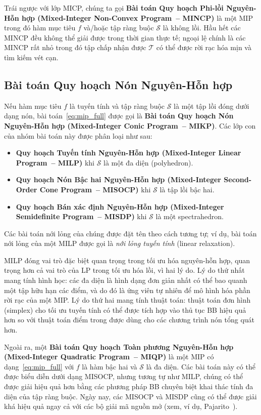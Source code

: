 Trái ngược với lớp MICP, chúng ta gọi \textbf{Bài toán Quy hoạch Phi-lồi Nguyên-Hỗn hợp
(Mixed-Integer Non-Convex Program~-- MINCP)} là một MIP trong đó hàm mục tiêu $f$ và/hoặc tập ràng buộc
$\mathcal{S}$ là không lồi.
Hầu hết các MINCP đều không thể giải được trong thời gian thực tế; ngoại lệ chính là các MINCP
rất nhỏ trong đó tập chấp nhận được $\mathcal{T}$ có thể được rời rạc hóa mịn và tìm kiếm vét cạn.

\subsection{Bài toán Quy hoạch Nón Nguyên-Hỗn hợp}

Nếu hàm mục tiêu $f$ là tuyến tính và tập ràng buộc $\mathcal{S}$ là một tập lồi đóng dưới dạng nón,
bài toán~\eqref{eq:mip_full} được gọi là \textbf{Bài toán Quy hoạch Nón Nguyên-Hỗn hợp
(Mixed-Integer Conic Program~-- MIKP)}.
Các lớp con của nhóm bài toán này được phân loại như sau:

\begin{itemize}
    \item \textbf{Quy hoạch Tuyến tính Nguyên-Hỗn hợp (Mixed-Integer Linear Program~-- MILP)}
    khi $\mathcal{S}$ là một đa diện (polyhedron).
    \item \textbf{Quy hoạch Nón Bậc hai Nguyên-Hỗn hợp (Mixed-Integer Second-Order Cone Program~-- MISOCP)}
    khi $\mathcal{S}$ là tập lồi bậc hai.
    \item \textbf{Quy hoạch Bán xác định Nguyên-Hỗn hợp (Mixed-Integer Semidefinite Program~-- MISDP)}
    khi $\mathcal{S}$ là một spectrahedron.
\end{itemize}

Các bài toán nới lỏng của chúng được đặt tên theo cách tương tự; ví dụ, bài toán nới lỏng của một MILP
được gọi là \textit{nới lỏng tuyến tính} (linear relaxation).

MILP đóng vai trò đặc biệt quan trọng trong tối ưu hóa nguyên-hỗn hợp, quan trọng hơn cả vai trò
của LP trong tối ưu hóa lồi, vì hai lý do.
Lý do thứ nhất mang tính hình học: các đa diện là hình dạng đơn giản nhất có thể bao quanh một tập
hữu hạn các điểm, và do đó là ứng viên tự nhiên để mô hình hóa phần rời rạc của một MIP.
Lý do thứ hai mang tính thuật toán: thuật toán đơn hình (simplex) cho tối ưu tuyến tính có thể
được tích hợp vào thủ tục BB hiệu quả hơn so với thuật toán điểm trong được dùng cho các chương trình
nón tổng quát hơn.

Ngoài ra, một \textbf{Bài toán Quy hoạch Toàn phương Nguyên-Hỗn hợp (Mixed-Integer Quadratic
Program~-- MIQP)} là một MIP có dạng~\eqref{eq:mip_full} với $f$ là hàm bậc hai và $\mathcal{S}$ là
đa diện.
Các bài toán này có thể được biểu diễn dưới dạng MISOCP, nhưng tương tự như MILP, chúng có thể được
giải hiệu quả hơn bằng các phương pháp BB chuyên biệt khai thác tính đa diện của tập ràng buộc.
Ngày nay, các MISOCP và MISDP cũng có thể được giải khá hiệu quả ngay cả với các bộ giải mã nguồn mở
(xem, ví dụ, Pajarito~\cite{lubin2018}).
